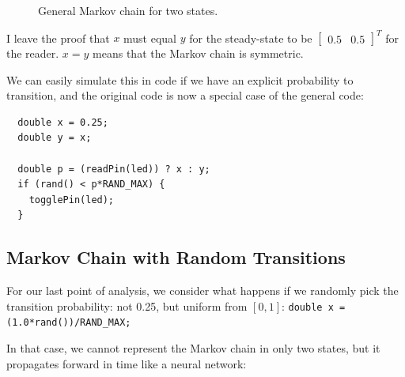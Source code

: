 \documentclass[11pt, oneside]{article}
\begin{document}
\begin{figure}[h!]
  \centering
  \caption{General Markov chain for two states.}
\end{figure}

I leave the proof that \( x \) must equal \( y \) for the steady-state to be 
\( \begin{bmatrix} 0.5 & 0.5 \end{bmatrix}^T \) for the reader. \( x = y \)
means that the Markov chain is symmetric.

We can easily simulate this in code if we have an explicit probability to
transition, and the original code is now a special case of the general code:
\begin{verbatim}
  double x = 0.25; 
  double y = x;

  double p = (readPin(led)) ? x : y;
  if (rand() < p*RAND_MAX) {
    togglePin(led);
  }
\end{verbatim}

\subsection{Markov Chain with Random Transitions}

For our last point of analysis, we consider what happens if we randomly pick
the transition probability: not 0.25, but uniform from \( [0, 1] \):
\texttt{double x = (1.0*rand())/RAND_MAX;}

In that case, we cannot represent the Markov chain in only two states, but
it propagates forward in time like a neural network:
\end{document}
